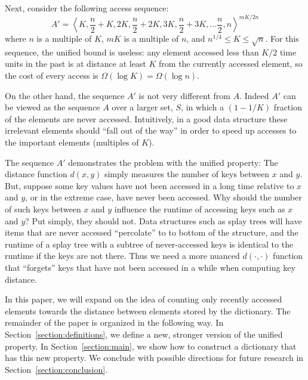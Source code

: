 \documentclass{llncs}
\newcommand{\BigOmega}[1]{\Omega\!\left(#1\right)}
\begin{document}
Next, consider the following access sequence:
\begin{equation}
	A' = \left\langle K, \frac{n}{2}+K, 2K, \frac{n}{2}+2K, 3K, \frac{n}{2}+3K, \ldots \frac{n}{2},n\right\rangle^{mK/2n}
\end{equation}
where $n$ is a multiple of $K$, $mK$ is a multiple of $n$, and $n^{1/4}\le K\le\sqrt{n}$. For this sequence, the unified bound is useless: any element accessed less than $K/2$ time units in the past is at distance at least $K$ from the currently accessed element, so the cost of every access is $\BigOmega{\log K} = \BigOmega{\log n}$.

On the other hand, the sequence $A'$ is not very different from $A$.  Indeed $A'$ can be viewed as the sequence $A$ over a larger set, $S$, in which a $(1-1/K)$ fraction of the elements are never accessed.  Intuitively, in a good data structure these irrelevant elements should ``fall out of the way'' in order to speed up accesses to the important elements (multiples of $K$).


The sequence $A'$ demonstrates the problem with the unified property: The distance function $d(x,y)$ simply measures the number of keys between $x$ and $y$. But, suppose some key values have not been accessed in a long time relative to $x$ and $y$, or in the extreme case, have never been accessed. Why should the number of such keys between $x$ and $y$ influence the runtime of accessing keys such as $x$ and $y$?
Put simply, they should not. Data structures such as splay trees will have items that are never accessed ``percolate'' to to bottom of the structure, and the runtime of a splay tree with a subtree of never-accessed keys is identical to the runtime if the keys are not there. Thus we need a more nuanced $d(\cdot,\cdot)$ function that ``forgets'' keys that have not been accessed in a while when computing key distance.

In this paper, we will expand on the idea of counting only recently accessed elements towards the distance between elements stored by the dictionary. The remainder of the paper is organized in the following way. In Section~\ref{section:definitions}, we define a new, stronger version of the unified property. In Section~\ref{section:main}, we show how to construct a dictionary that has this new property. We conclude with possible directions for future research in Section~\ref{section:conclusion}.
\end{document}
